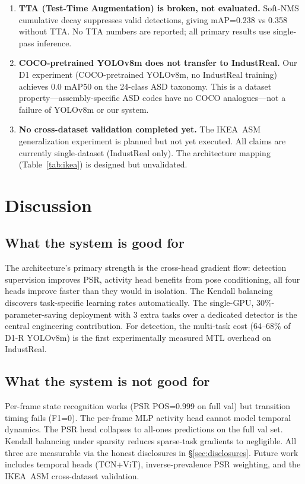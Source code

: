 \documentclass[conference]{IEEEtran}
\newcommand{\industreal}{IndustReal}
\begin{document}
\begin{enumerate}
\item \textbf{TTA (Test-Time Augmentation) is broken, not evaluated.} Soft-NMS cumulative decay suppresses valid detections, giving mAP=0.238 vs 0.358 without TTA. No TTA numbers are reported; all primary results use single-pass inference.

\item \textbf{COCO-pretrained YOLOv8m does not transfer to \industreal.} Our D1 experiment (COCO-pretrained YOLOv8m, no IndustReal training) achieves 0.0 mAP50 on the 24-class ASD taxonomy. This is a dataset property---assembly-specific ASD codes have no COCO analogues---not a failure of YOLOv8m or our system.

\item \textbf{No cross-dataset validation completed yet.} The IKEA~ASM~\cite{benshabat2021ikea} generalization experiment is planned but not yet executed. All claims are currently single-dataset (\industreal{} only). The architecture mapping (Table~\ref{tab:ikea}) is designed but unvalidated.
\end{enumerate}

\section{Discussion}
\label{sec:discussion}

\subsection{What the system is good for}
The architecture's primary strength is the cross-head gradient flow: detection supervision improves PSR, activity head benefits from pose conditioning, all four heads improve faster than they would in isolation. The Kendall balancing discovers task-specific learning rates automatically. The single-GPU, 30\%-parameter-saving deployment with 3 extra tasks over a dedicated detector is the central engineering contribution. For detection, the multi-task cost (64--68\% of D1-R YOLOv8m) is the first experimentally measured MTL overhead on \industreal.

\subsection{What the system is not good for}
Per-frame state recognition works (PSR POS=0.999 on full val) but transition timing fails (F1=0). The per-frame MLP activity head cannot model temporal dynamics. The PSR head collapses to all-ones predictions on the full val set. Kendall balancing under sparsity reduces sparse-task gradients to negligible. All three are measurable via the honest disclosures in \S\ref{sec:disclosures}. Future work includes temporal heads (TCN+ViT), inverse-prevalence PSR weighting, and the IKEA~ASM cross-dataset validation.
\end{document}
